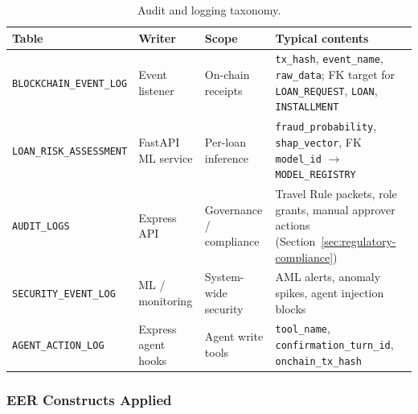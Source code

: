 \documentclass[12pt,a4paper]{report}
\newcommand{\tableheadcolor}{\rowcolor{TableHeadBg}}
\newcommand{\tableheadfont}{\bfseries}
\begin{document}
\begin{table}[H]
\centering
\small
\setlength{\tabcolsep}{4pt}
\renewcommand{\arraystretch}{1.12}
\caption[Audit and logging taxonomy]{Audit and logging taxonomy.}
\label{tab:db-audit-taxonomy}
\begin{tabular}{@{}>{\raggedright\arraybackslash}p{3.4cm}>{\raggedright\arraybackslash}p{2.2cm}>{\raggedright\arraybackslash}p{3.2cm}>{\raggedright\arraybackslash}p{4.7cm}@{}}
\toprule
\tableheadcolor
\tableheadfont Table &
\tableheadfont Writer &
\tableheadfont Scope &
\tableheadfont Typical contents \\
\midrule
\texttt{BLOCKCHAIN\_EVENT\_LOG} &
  Event listener &
  On-chain receipts &
  \texttt{tx\_hash}, \texttt{event\_name}, \texttt{raw\_data}; FK target for \texttt{LOAN\_REQUEST}, \texttt{LOAN}, \texttt{INSTALLMENT} \\
\rowcolor{RowShade}
\texttt{LOAN\_RISK\_ASSESSMENT} &
  FastAPI ML service &
  Per-loan inference &
  \texttt{fraud\_probability}, \texttt{shap\_vector}, FK \texttt{model\_id} $\to$ \texttt{MODEL\_REGISTRY} \\
\texttt{AUDIT\_LOGS} &
  Express API &
  Governance / compliance &
  Travel Rule packets, role grants, manual approver actions (Section~\ref{sec:regulatory-compliance}) \\
\rowcolor{RowShade}
\texttt{SECURITY\_EVENT\_LOG} &
  ML / monitoring &
  System-wide security &
  AML alerts, anomaly spikes, agent injection blocks \\
\texttt{AGENT\_ACTION\_LOG} &
  Express agent hooks &
  Agent write tools &
  \texttt{tool\_name}, \texttt{confirmation\_turn\_id}, \texttt{onchain\_tx\_hash} \\
\bottomrule
\end{tabular}
\end{table}

\subsubsection{EER Constructs Applied}
\end{document}
